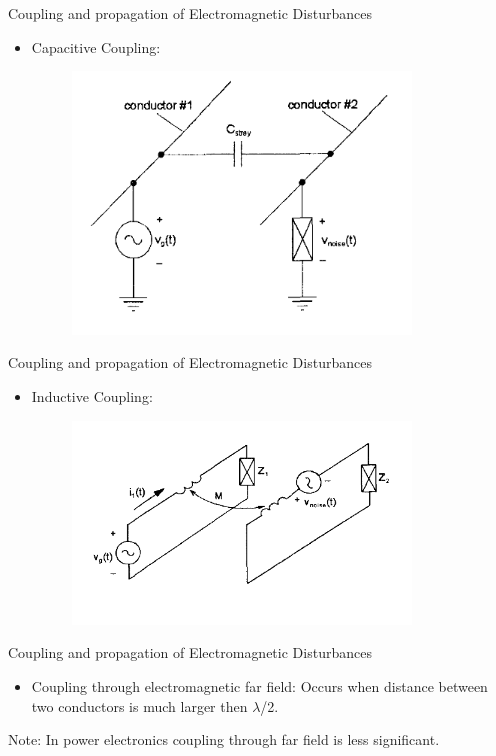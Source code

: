 \documentclass{beamer}
\begin{document}
\begin{frame}{Coupling and propagation of Electromagnetic Disturbances}
\begin{itemize}
\item Capacitive Coupling:
	\begin{figure}[ht!]
	\includegraphics[width=90mm]{FIG_2.png}
	\end{figure}
\end{itemize}
\end{frame}

\begin{frame}{Coupling and propagation of Electromagnetic Disturbances}
\begin{itemize}
\item Inductive Coupling:
	\begin{figure}[ht!]
	\includegraphics[width=90mm]{FIG_3.png}
	\end{figure}
\end{itemize}
\end{frame}

\begin{frame}{Coupling and propagation of Electromagnetic Disturbances}
\begin{itemize}
\item Coupling through electromagnetic far field: Occurs when distance between two conductors is much larger then $\lambda$/2.
\end{itemize}
Note: In power electronics coupling through far field is less significant.  
\end{frame}
\end{document}
